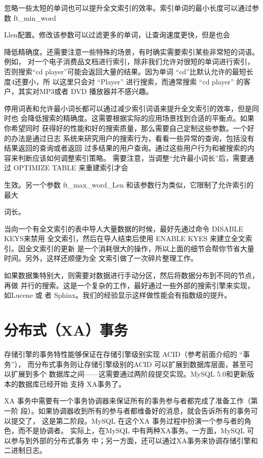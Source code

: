 忽略一些太短的单词也可以提升全文索引的效率。索引单词的最小长度可以通过参数
ft\_min\_word

Llen配置。修改该参数可以过滤更多的单词，让查询速度更快，但是也会

降低精确度。还需要注意一些特殊的场景，有时确实需要索引某些非常短的词语。例如，
对一个电子消费品文档进行索引，除非我们允许对很短的单词进行索引，否则搜索“cd
player”可能会返回大量的结果。因为单词 “cd”比默认允许的最短长度4还要小，所
以这里只会对 “Player” 进行搜索，而通常搜索 “cd player” 的客户，其实对MP3或者
DVD 播放器并不感兴趣。

停用词表和允许最小词长都可以通过减少索引词语来提升全文索引的效率，但是同时也
会降低搜索的精确度。这需要根据实际的应用场景找到合适的平衡点。如果你希望同时
获得好的性能和好的搜索质量，那么需要自己定制这些参数。一个好的办法是通过日志
系统来研究用户的搜索行为，看看一些异常的查询，包括没有结果返回的查询或者返回
过多结果的用户查询。通过这些用户行为和被搜索的内容来判断应该如何调整索引策略。
需要注意，当调整“允许最小词长”后，需要通过 OPTIMIZE TABLE 来重建索引才会

生效。另一个参数 ft\_max\_word\_Len 和该参数行为类似，它限制了允许索引的最大

词长。

当向一个有全文索引的表中导人大量数据的时候，最好先通过命令 DISABLE KEYS来禁用
全文索引，然后在导人结束后使用 ENABLE KYES 来建立全文索引。因全文索引的更新
是一个消耗很大的操作，所以上面的细节会帮你节省大量时间。另外，这样还顺便为全
文索引做了一次碎片整理工作。

如果数据集特别大，则需要对数据进行手动分区，然后将数据分布到不同的节点，再做
并行的搜索。这是一个复杂的工作，最好通过一些外部的搜索引擎来实现，如Lucene 或
者 Sphinx。我们的经验显示这样做性能会有指数级的提升。

\section{分布式（XA）事务}
存储引擎的事务特性能够保证在存储引擎级别实现 ACID（参考前面介绍的 “事务”），
而分布式事务则让存储引擎级别的ACID 可以扩展到数据库层面，甚至可以扩展到多个
数据库之间——这需要通过两阶段提交实现。MySQL 5.0和更新版本的数据库已经开始
支持 XA事务了。

XA 事务中需要有一个事务协调器来保证所有的事务参与者都完成了准备工作（第一阶
段）。如果协调器收到所有的参与者都维备好的消息，就会告诉所有的事务可以提交了，
这是第二阶段。MySQL 在这个XA 事务过程中扮演一个参与者的角色，而不是协调者。
实际上，在MySQL 中有两种XA事务。一方面，MySQL 可以参与到外部的分布式事务
中；另一方面，还可以通过XA事务来协调存储引擎和二进制日志。


